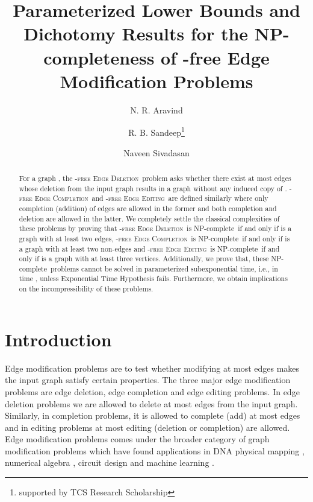 \documentclass[envcountsame,envcountsect,10pt,oribibl]{llncs}
\newcommand{\pname}[1]{\textnormal{\textsc{#1}}}
\newcommand{\cclass}[1]{\textnormal{\textsf{#1}}}
\newcommand{\HED}{\pname{-free Edge Deletion}}
\newcommand{\HEC}{\pname{-free Edge Completion}}
\newcommand{\HEE}{\pname{-free Edge Editing}}
\newcommand{\NPC}{\cclass{NP-complete}}
\begin{document}
\mainmatter              \title{Parameterized Lower Bounds and Dichotomy Results for the NP-completeness of -free Edge Modification Problems}
\author{N. R. Aravind \and R. B. Sandeep\thanks{supported by TCS Research Scholarship} \and Naveen Sivadasan}

\maketitle              \begin{abstract}
For a graph , the \HED\ problem asks whether there exist at most  
edges whose deletion from the input graph  
results in a graph without any induced copy of . 
\HEC\ and \HEE\ are defined similarly where
only completion (addition) of edges are allowed in the former and 
both completion and deletion are allowed in the latter. 
We completely settle the classical complexities of these problems by proving that
\HED\ is \NPC\ if and only if  is a graph with at least two edges, 
\HEC\ is \NPC\ if and only if  is a graph with at least two non-edges and
\HEE\ is \NPC\ if and only if  is a graph with at least three vertices.
Additionally, we prove that, these \NPC\ problems cannot be 
solved in parameterized subexponential time, i.e., 
in time , unless Exponential Time Hypothesis fails.
Furthermore, we obtain implications on the incompressibility of these 
problems.
\end{abstract}
\section{Introduction}
\label{sec:introduction}

Edge modification problems are to test whether modifying at most  edges
makes the input graph satisfy certain properties. The three major edge modification
problems are edge deletion, edge completion and edge editing problems.
In edge deletion problems we are allowed to delete at most  edges from
the input graph. Similarly, in completion problems, it is allowed to
complete (add) at most  edges and in editing problems at most
 editing (deletion or completion) are allowed. Edge modification problems
comes under the broader category of graph modification problems which have
found applications in DNA physical mapping 
\cite{goldberg1995four},
numerical algebra \cite{rose1972graph}, circuit design \cite{el1988complexity}
and machine learning \cite{DBLP:journals/ml/BansalBC04}.
\end{document}
